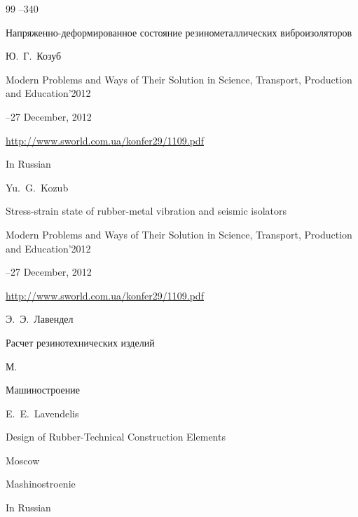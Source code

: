 \begin{thebibliography}{99}
--340






\eprint Напряженно-деформированное состояние резинометаллических виброизоляторов

\by Ю.~Г.~Козуб

\eprintinfo Modern Problems and Ways of Their Solution in Science, Transport, Production and Education'2012


--27 December, 2012


\elink \url{http://www.sworld.com.ua/konfer29/1109.pdf}

\misctransl

\lang In Russian

\by Yu.~G.~Kozub

\eprint Stress-strain state of rubber-metal vibration and seismic isolators 

\eprintinfo Modern Problems and Ways of Their Solution in Science, Transport, Production and Education'2012


--27 December, 2012


\elink \url{http://www.sworld.com.ua/konfer29/1109.pdf}




\by Э.~Э.~Лавендел

\book Расчет резинотехнических изделий

\publaddr М.

\publ Машиностроение



\misctransl

\by E.~E.~Lavendelis

\book Design of Rubber-Technical Construction Elements


\publaddr Moscow

\publ Mashinostroenie  


\lang In Russian





\end{thebibliography}
